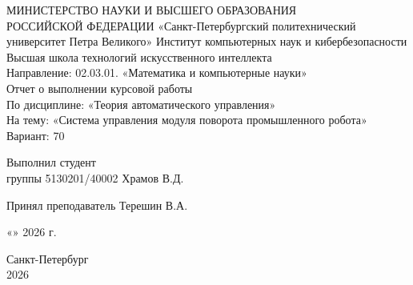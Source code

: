 \documentclass[a4paper, 14pt]{extarticle}
\begin{document}
    \begin{titlepage}
        \thispagestyle{empty}
        \begin{center}
            { \large МИНИСТЕРСТВО НАУКИ И ВЫСШЕГО ОБРАЗОВАНИЯ \\ 
                РОССИЙСКОЙ ФЕДЕРАЦИИ }
            { «Санкт-Петербургский политехнический университет Петра Великого» }
            { Институт компьютерных наук и кибербезопасности \\ 
                Высшая школа технологий искусственного интеллекта \\
                Направление: 02.03.01. «Математика и компьютерные науки» \\ }       
              \vspace{3cm}
            { \large Отчет о выполнении курсовой работы \\ 
              По дисциплине: «Теория автоматического управления» \\ 
              На тему: «Система управления модуля поворота промышленного робота» \\
                Вариант: 70}
        \end{center}
        \vspace{3cm}
        \begin{center}
            \noindent
            \begin{minipage}[t]{\textwidth}
                \raggedright Выполнил студент \\ группы 5130201/40002 \hfill 
                \underline{\hspace{3cm}} Храмов В.Д.
            \end{minipage}
            
            \vspace{1cm}
            \noindent
            \begin{minipage}[t]{\textwidth}
                \raggedright Принял преподаватель \hfill 
                \underline{\hspace{3cm}}  Терешин В.А.
            \end{minipage}
        \end{center}
        \vspace{1cm}
        \begin{flushright}
            \large
            «\underline{\hspace{1cm}}» \underline{\hspace{3cm}} 2026 г.
        \end{flushright}
        \vspace{0.5cm}
        \vfill
        \begin{center}
            Санкт-Петербург \\
            2026
        \end{center}   
    \end{titlepage}
    \setcounter{page}{2}
    \newpage
    \tableofcontents
    \newpage
\end{document}
